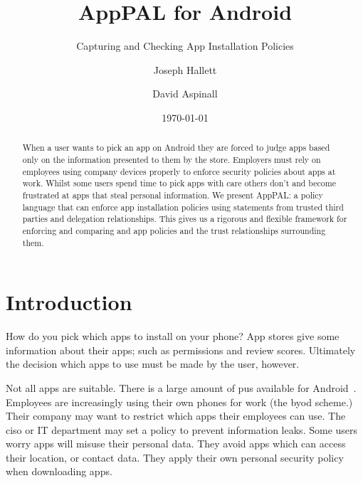 \documentclass[a4paper]{scrartcl}
\title{AppPAL for Android}
\subtitle{Capturing and Checking App Installation Policies}
\author{Joseph Hallett \and David Aspinall}
\date{\today}
\newcommand{\comment}[1]{}%
\begin{document}
\maketitle

\begin{abstract}
  When a user wants to pick an app on Android they are forced to judge apps based only on the information presented to them by the store.
  Employers must rely on employees using company devices properly to enforce security policies about apps at work.
  Whilst some users spend time to pick apps with care others don't and become frustrated at apps that steal personal information.
  We present AppPAL: a policy language that can enforce app installation policies using statements from trusted third parties and delegation relationships.
  This gives us a rigorous and flexible framework for enforcing and comparing and app policies and the trust relationships surrounding them.
\end{abstract}

\section{Introduction \comment{1 page}}
\label{sec:introduction}

How do you pick which apps to install on your phone?  
App stores give some information about their apps; such as permissions and review scores.
Ultimately the decision which apps to use must be made by the user, however.

Not all apps are suitable. 
There is a large amount of \ac{pus} available for Android~\citep{Truong:2014bi,Svajcer:2013tp}. 
Employees are increasingly using their own phones for work (the \ac{byod} scheme.)
Their company may want to restrict which apps their employees can use.
The \ac{ciso} or IT department may set a policy to prevent information leaks.
Some users worry apps will misuse their personal data.
They avoid apps which can access their location, or contact data.
They apply their own personal security policy when downloading apps.
\end{document}

